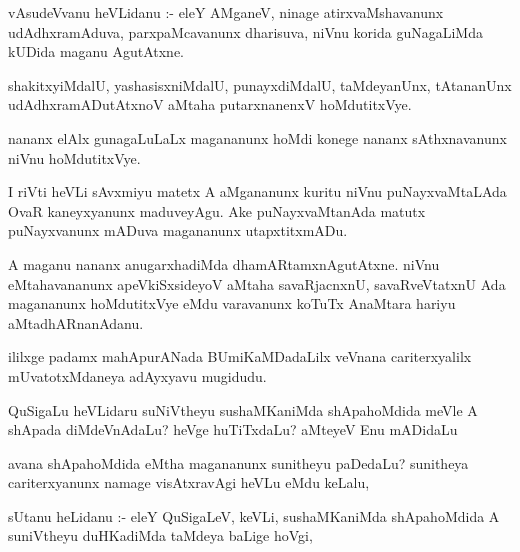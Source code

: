\documentclass{article}
\begin{document}
\begin{mn}
vAsudeVvanu heVLidanu :- eleY AMganeV, ninage atirxvaMshavanunx udAdhxramAduva, 
parxpaMcavanunx dharisuva, niVnu korida guNagaLiMda kUDida maganu AgutAtxne.
\end{mn}

\begin{mn}
shakitxyiMdalU, yashasisxniMdalU, punayxdiMdalU, taMdeyanUnx, tAtananUnx 
udAdhxramADutAtxnoV aMtaha putarxnanenxV hoMdutitxVye. 
\end{mn}

\begin{mn}
nananx elAlx gunagaLuLaLx magananunx hoMdi konege nananx sAthxnavanunx niVnu hoMdutitxVye.
\end{mn}

\begin{mn}
I riVti heVLi sAvxmiyu matetx A aMgananunx  kuritu niVnu puNayxvaMtaLAda OvaR 
kaneyxyanunx maduveyAgu.  Ake puNayxvaMtanAda matutx puNayxvanunx mADuva magananunx utapxtitxmADu.
\end{mn}

\begin{mn}
A maganu nananx anugarxhadiMda dhamARtamxnAgutAtxne. niVnu eMtahavananunx 
apeVkiSxsideyoV aMtaha savaRjacnxnU, savaRveVtatxnU Ada magananunx hoMdutitxVye 
eMdu varavanunx koTuTx AnaMtara hariyu aMtadhARnanAdanu.
\end{mn}

\begin{mn}
ililxge padamx mahApurANada BUmiKaMDadaLilx veVnana cariterxyalilx mUvatotxMdaneya adAyxyavu mugidudu.
\end{mn}




\begin{mn}
QuSigaLu heVLidaru suNiVtheyu sushaMKaniMda shApahoMdida meVle A shApada diMdeVnAdaLu?  heVge huTiTxdaLu?  aMteyeV Enu mADidaLu
\end{mn}

\begin{mn}
avana shApahoMdida eMtha magananunx  sunitheyu paDedaLu? sunitheya cariterxyanunx namage visAtxravAgi heVLu eMdu keLalu,
\end{mn}

\begin{mn}
sUtanu heLidanu :- eleY QuSigaLeV, keVLi, sushaMKaniMda shApahoMdida A 
suniVtheyu duHKadiMda taMdeya baLige hoVgi, 
\end{mn}
\end{document}
